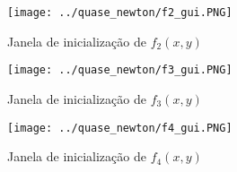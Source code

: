 \begin{figure}[H]
	\begin{center}	
		\texttt{[image: ../quase\_newton/f2\_gui.PNG]}
		\caption{Janela de inicialização de $ f_2(x,y) $}
		\label{fig:f2_gui_qn}
	\end{center}
\end{figure}



\begin{figure}[H]
	\begin{center}	
		\texttt{[image: ../quase\_newton/f3\_gui.PNG]}
		\caption{Janela de inicialização de $ f_3(x,y) $}
		\label{fig:f3_gui_qn}
	\end{center}
\end{figure}



\begin{figure}[H]
	\begin{center}	
		\texttt{[image: ../quase\_newton/f4\_gui.PNG]}
		\caption{Janela de inicialização de $ f_4(x,y) $}
		\label{fig:f4_gui_qn}
	\end{center}
\end{figure}

\newpage